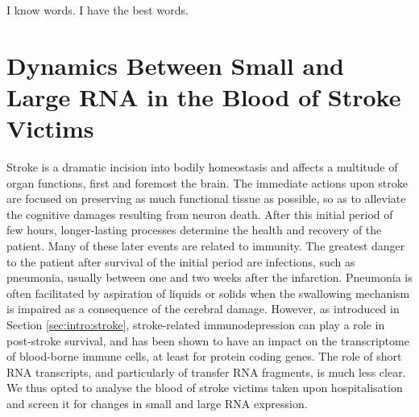 \begin{savequote}[75mm]
I know words. I have the best words.
\end{savequote}

\chapter[Dynamics Between Small and Large RNA\texorpdfstring{\\}{} in the Blood of Stroke Victims]{Dynamics Between Small and Large RNA in the Blood of Stroke Victims}

Stroke is a dramatic incision into bodily homeostasis and affects a multitude of organ functions, first and foremost the brain. The immediate actions upon stroke are focused on preserving as much functional tissue as possible, so as to alleviate the cognitive damages resulting from neuron death. After this initial period of few hours, longer-lasting processes determine the health and recovery of the patient. Many of these later events are related to immunity. The greatest danger to the patient after survival of the initial period are infections, such as pneumonia, usually between one and two weeks after the infarction. Pneumonia is often facilitated by aspiration of liquids or solids when the swallowing mechanism is impaired as a consequence of the cerebral damage. However, as introduced in Section \ref{sec:intro:stroke}, stroke-related immunodepression can play a role in post-stroke survival, and has been shown to have an impact on the transcriptome of blood-borne immune cells, at least for protein coding genes. The role of short RNA transcripts, and particularly of transfer RNA fragments, is much less clear. We thus opted to analyse the blood of stroke victims taken upon hospitalisation and screen it for changes in small and large RNA expression.

\newpage




